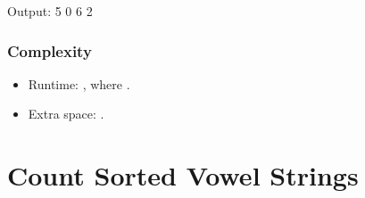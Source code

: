 \documentclass[letterpaper,12pt,english]{book}
\begin{document}
\begin{sphinxVerbatim}[commandchars=\\\{\}]
\end{sphinxVerbatim}

\begin{sphinxVerbatim}[commandchars=\\\{\}]
Output:
5
0
6
2
\end{sphinxVerbatim}


\subsubsection{Complexity}
\label{\detokenize{Mathematics/09_MTH_121_Best_Time_to_Buy_and_Sell_Stock:id4}}\begin{itemize}
\item {} 
\sphinxAtStartPar
Runtime: , where .

\item {} 
\sphinxAtStartPar
Extra space: .

\end{itemize}

\sphinxstepscope


\section{Count Sorted Vowel Strings}
\label{\detokenize{Mathematics/09_MTH_1641_Count_Sorted_Vowel_Strings:count-sorted-vowel-strings}}\label{\detokenize{Mathematics/09_MTH_1641_Count_Sorted_Vowel_Strings::doc}}
\end{document}
